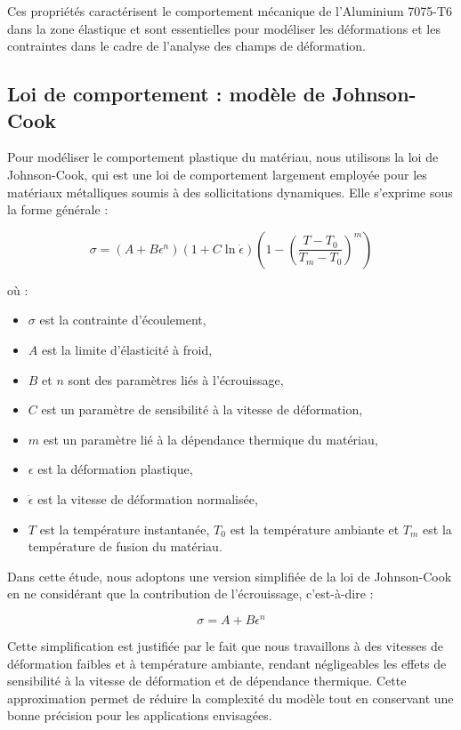 \documentclass[12pt,a4paper]{article}
\begin{document}
Ces propriétés caractérisent le comportement mécanique de l'Aluminium 7075-T6 dans la zone élastique et sont essentielles pour modéliser les déformations et les contraintes dans le cadre de l'analyse des champs de déformation.

\subsection{Loi de comportement : modèle de Johnson-Cook}
Pour modéliser le comportement plastique du matériau, nous utilisons la loi de Johnson-Cook, qui est une loi de comportement largement employée pour les matériaux métalliques soumis à des sollicitations dynamiques. Elle s'exprime sous la forme générale :

\begin{equation}
    \sigma = \left( A + B \epsilon^n \right) \left( 1 + C \ln{\dot{\epsilon}} \right) \left( 1 - \left( \frac{T - T_0}{T_m - T_0} \right)^m \right)
\end{equation}

où :
\begin{itemize}
    \item \( \sigma \) est la contrainte d'écoulement,
    \item \( A \) est la limite d'élasticité à froid,
    \item \( B \) et \( n \) sont des paramètres liés à l'écrouissage,
    \item \( C \) est un paramètre de sensibilité à la vitesse de déformation,
    \item \( m \) est un paramètre lié à la dépendance thermique du matériau,
    \item \( \epsilon \) est la déformation plastique,
    \item \( \dot{\epsilon} \) est la vitesse de déformation normalisée,
    \item \( T \) est la température instantanée, \( T_0 \) est la température ambiante et \( T_m \) est la température de fusion du matériau.
\end{itemize}

Dans cette étude, nous adoptons une version simplifiée de la loi de Johnson-Cook en ne considérant que la contribution de l'écrouissage, c'est-à-dire :

\begin{equation}
    \sigma = A + B \epsilon^n
\end{equation}

Cette simplification est justifiée par le fait que nous travaillons à des vitesses de déformation faibles et à température ambiante, rendant négligeables les effets de sensibilité à la vitesse de déformation et de dépendance thermique. Cette approximation permet de réduire la complexité du modèle tout en conservant une bonne précision pour les applications envisagées.
\end{document}
